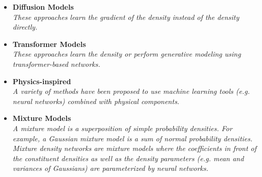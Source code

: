 \documentclass[12pt,letterpaper]{article}
\begin{document}
\begin{itemize}
\begin{itemize}
		\item \textbf{Diffusion Models}~\cite{Qian:2026gux,Huang:2026irl,Robledo:2026yfd,Komijani:2026lan,Sadek:2026fkr,Bogorad:2026oxa,Patel:2026npj,Alharazin:2026wfh,Alharazin:2026lcb,Liu:2026edw,Nguyen:2026wsv,Kanwar:2025wuc,Gaede:2025shc,Buss:2025kiu,Vega:2025hgz,Raikwar:2025fky,McKeown:2025gtw,Cheng:2025qhg,Martinez:2025xfu,Barman:2025bpx,Buss:2025cyw,Giroux:2025mit,Zhang:2025mmm,Nishimura:2025knz,Nishimura:2025rsk,Dreyer:2025zhp,OmanaKuttan:2025fqc,Zhu:2025pmw,Chen:2025kfo,MODE:2025zir,Aarts:2024agm,Habibi:2024fbn,Fukushima:2024oij,Krause:2024avx,Araz:2024bom,Algren:2024bqw,Aarts:2024rsl,Zhu:2024kiu,Wojnar:2024cbn,Quetant:2024ftg,Kita:2024nnw,Favaro:2024rle,Kobylianskii:2024sup,Jiang:2024bwr,Vaselli:2024vrx,Kobylianskii:2024ijw,Jiang:2024ohg,Sengupta:2023vtm,Butter:2023ira,Wang:2023sry,Heimel:2023ngj,Devlin:2023jzp,Buhmann:2023acn,Buhmann:2023zgc,Buhmann:2023kdg,Hunt-Smith:2023ccp,Mikuni:2023tqg,Diefenbacher:2023wec,Cotler:2023lem,Diefenbacher:2023flw,Amram:2023onf,Imani:2023blb,Leigh:2023zle,Acosta:2023zik,Mikuni:2023tok,Butter:2023fov,Buhmann:2023bwk,Shmakov:2023kjj,Mikuni:2023dvk,Leigh:2023toe,Mikuni:2022xry}
		\\\textit{These approaches learn the gradient of the density instead of the density directly.}
		\item \textbf{Transformer Models}~\cite{Amram:2026zzv,Li:2026yrp,Huang:2026irl,Hildebrandt:2026lyj,Cardona-Giraldo:2026rnn,Favaro:2026awn,Novak:2025jqv,Kim:2025aln,Favaro:2025ift,Walden:2025cpf,Favaro:2025pgz,Barman:2025bpx,Yip:2025hon,Spinner:2025prg,Wang:2024rup,Brehmer:2024yqw,Quetant:2024ftg,Spinner:2024hjm,Paeng:2024ary,Li:2023xhj,Tomiya:2023jdy,Raine:2023fko,Butter:2023fov,Finke:2023veq}
		\\\textit{These approaches learn the density or perform generative modeling using transformer-based networks.}
		\item \textbf{Physics-inspired}~\cite{Abasov:2024hyq,Larkoski:2023xam,Barenboim:2021vzh,Lai:2020byl,1808876,Andreassen:2019txo,Andreassen:2018apy}
		\\\textit{A variety of methods have been proposed to use machine learning tools (e.g. neural networks) combined with physical components.}
		\item \textbf{Mixture Models}~\cite{Singha:2026slc,Vermunt:2023fsr,Liu:2022dem,Jia:2022ulh,Graziani:2021vai,Burton:2021tsd,Chen:2020uds}
		\\\textit{A mixture model is a superposition of simple probability densities.  For example, a Gaussian mixture model is a sum of normal probability densities.  Mixture density networks are mixture models where the coefficients in front of the constituent densities as well as the density parameters (e.g. mean and variances of Gaussians) are parameterized by neural networks.}

\end{itemize}
\end{itemize}
\end{document}
